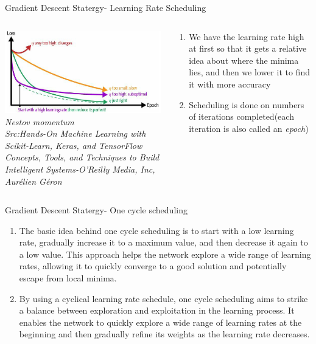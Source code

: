 \begin{frame}{Gradient Descent Statergy- Learning Rate Scheduling}
	\begin{columns}[T]
        \begin{column}{0.4\textwidth}
        	\includegraphics[width=\textwidth]{images/learning rate schedule.png}
        	\tiny{\textit{Nestov momentum\\ Src:Hands-On Machine Learning with Scikit-Learn, Keras, and TensorFlow  Concepts, Tools, and Techniques to Build Intelligent Systems-O'Reilly Media, Inc, Aurélien Géron}}
        \end{column}
	    \begin{column}{0.6\textwidth}
    	    \begin{enumerate}[$\bullet$]
        		\item We have the learning rate high at first so that it gets a relative idea about where the minima lies\pause, and then we lower it to find it with more accuracy\pause
        		\item Scheduling is done on numbers of iterations completed(each iteration is also called an \textit{epoch})\pause
        	\end{enumerate}
    	\end{column}
    \end{columns}
\end{frame}


\begin{frame}{Gradient Descent Statergy- One cycle scheduling}
    \begin{enumerate}[$\bullet$]
		\item The basic idea behind one cycle scheduling is to start with a low learning rate, gradually increase it to a maximum value, and then decrease it again to a low value. This approach helps the network explore a wide range of learning rates, allowing it to quickly converge to a good solution and potentially escape from local minima.
		\item By using a cyclical learning rate schedule, one cycle scheduling aims to strike a balance between exploration and exploitation in the learning process. It enables the network to quickly explore a wide range of learning rates at the beginning and then gradually refine its weights as the learning rate decreases.
    \end{enumerate}
\end{frame}


